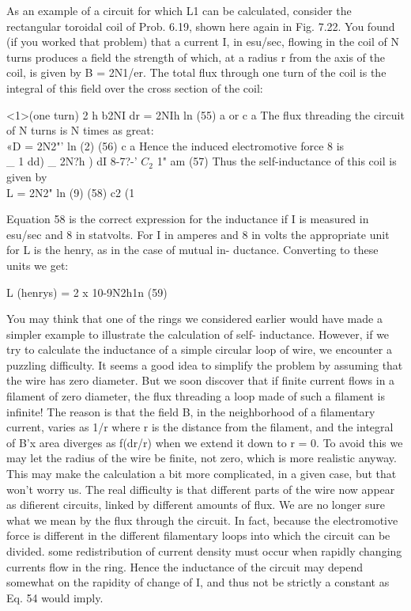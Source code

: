 As an example of a circuit for which L1 can be calculated, consider
the rectangular toroidal coil of Prob. 6.19, shown here again in
Fig. 7.22. You found (if you worked that problem) that a current I,
in esu/sec, flowing in the coil of N turns produces a field the strength
of which, at a radius r from the axis of the coil, is given by B = 2N1/er.
The total flux through one turn of the coil is the integral of this field
over the cross section of the coil:

\begin{equation}
\end{equation}
<1>(one turn) 2 h b2NI dr = 2NIh ln  (55)
a or c a
The flux threading the circuit of N turns is N times as great:
\begin{equation}
\end{equation}
«D = 2N2"' ln (2) (56)
c a
Hence the induced electromotive force 8 is
\begin{equation}
\end{equation}
_ 1 dd) _ 2N?h ) dI
8-7?-' $C_2$ 1" am (57)
Thus the self-inductance of this coil is given by
\begin{equation}
\end{equation}
L = 2N2" ln (9) (58)
c2 (1

Equation 58 is the correct expression for the inductance if I is measured
in esu/sec and 8 in statvolts. For I in amperes and 8 in volts
the appropriate unit for L is the henry, as in the case of mutual in-
ductance. Converting to these units we get:

\begin{equation}
\end{equation}
L (henrys) = 2 x 10-9N2h1n (59)

You may think that one of the rings we considered earlier would
have made a simpler example to illustrate the calculation of self-
inductance. However, if we try to calculate the inductance of a
simple circular loop of wire, we encounter a puzzling difficulty. It
seems a good idea to simplify the problem by assuming that the wire
has zero diameter. But we soon discover that if finite current flows
in a filament of zero diameter, the flux threading a loop made of such
a filament is infinite! The reason is that the field B, in the neighborhood
of a filamentary current, varies as 1/r where r is the distance
from the filament, and the integral of B'x area diverges as f(dr/r)
when we extend it down to r = 0. To avoid this we may let the radius
of the wire be finite, not zero, which is more realistic anyway. This
may make the calculation a bit more complicated, in a given case,
but that won't worry us. The real difficulty is that different parts of
the wire now appear as difierent circuits, linked by different amounts
of flux. We are no longer sure what we mean by the flux through the
circuit. In fact, because the electromotive force is different in the
different filamentary loops into which the circuit can be divided. some
redistribution of current density must occur when rapidly changing
currents flow in the ring. Hence the inductance of the circuit may
depend somewhat on the rapidity of change of I, and thus not be
strictly a constant as Eq. 54 would imply.

